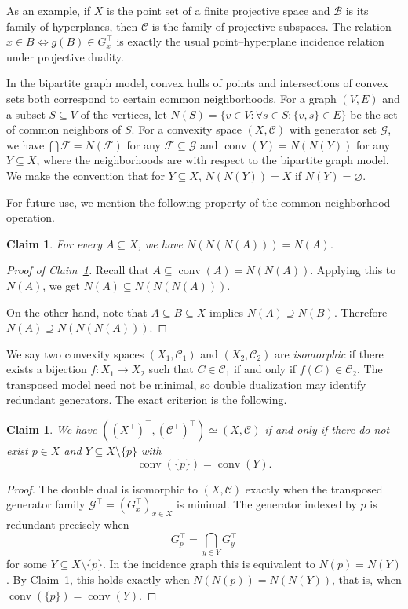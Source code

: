 \documentclass[11pt]{article}
\newtheorem{claim}[thm]{Claim}
\theoremstyle{definition}
\newcommand{\F}{\mathcal{F}}
\newcommand{\C}{\mathcal{C}}
\newcommand{\B}{\mathcal{B}}
\newcommand{\G}{\mathcal{G}}
\newcommand{\conv}{\operatorname{conv}}
\begin{document}
As an example, if $X$ is the point set of a finite projective space and $\B$ is its family of hyperplanes, then $\C$ is the family of projective subspaces. The relation $x \in B \iff g(B) \in G_x^\top$ is exactly the usual point--hyperplane incidence relation under projective duality.

In the bipartite graph model, convex hulls of points and intersections of convex sets both correspond to certain common neighborhoods. For a graph $(V,E)$ and a subset $S \subseteq V$ of the vertices, let $N(S) = \{v \in V : \forall s \in S: \{v,s\} \in E\}$ be the set of common neighbors of $S$. For a convexity space $(X,\C)$ with generator set $\G$, we have $\bigcap \F = N(\F)$ for any $\F \subseteq \G$ and $\conv(Y) = N(N(Y))$ for any $Y \subseteq X$, where the neighborhoods are with respect to the bipartite graph model. We make the convention that for $Y \subseteq X$, $N(N(Y)) = X$ if $N(Y) = \varnothing$.

For future use, we mention the following property of the common neighborhood operation.
\begin{claim}\label{claim:NNN=N}
    For every $A \subseteq X$, we have $N(N(N(A))) = N(A)$.
\end{claim}
\begin{proof}[Proof of Claim~\ref{claim:NNN=N}]
    Recall that $A \subseteq \conv(A) = N(N(A))$.
    Applying this to $N(A)$, we get $N(A) \subseteq N(N(N(A)))$.

    On the other hand, note that $A \subseteq B \subseteq X$ implies $N(A) \supseteq N(B)$.
    Therefore $N(A) \supseteq N(N(N(A)))$.
    \renewcommand\qedsymbol{$\blacksquare$}
\end{proof}

We say two convexity spaces $(X_1, \C_1)$ and $(X_2, \C_2)$ are \emph{isomorphic} if there exists a bijection $f: X_1 \to X_2$ such that $C \in \C_1$ if and only if $f(C) \in \C_2$.
The transposed model need not be minimal, so double dualization may identify redundant generators. The exact criterion is the following.

\begin{claim}\label{cl:doubledual}
We have $((X^\top)^\top,(\C^\top)^\top)\simeq(X,\C)$ if and only if there do not exist $p\in X$ and $Y\subseteq X\setminus\{p\}$ with
\[
\conv(\{p\})=\conv(Y).
\]
\end{claim}

\begin{proof}
The double dual is isomorphic to $(X,\C)$ exactly when the transposed generator family $\G^\top=(G_x^\top)_{x\in X}$ is minimal. The generator indexed by $p$ is redundant precisely when
\[
G_p^\top=\bigcap_{y\in Y}G_y^\top
\]
for some $Y\subseteq X\setminus\{p\}$. In the incidence graph this is equivalent to $N(p)=N(Y)$. By Claim~\ref{claim:NNN=N}, this holds exactly when $N(N(p))=N(N(Y))$, that is, when $\conv(\{p\})=\conv(Y)$.
\end{proof}
\end{document}
